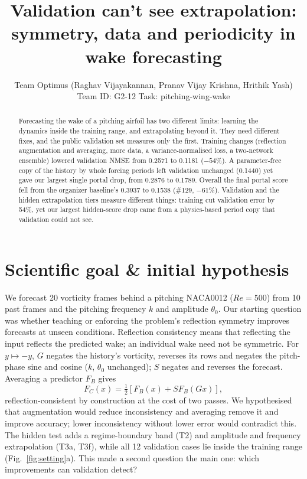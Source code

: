\documentclass{article}
\title{Validation can't see extrapolation: symmetry, data and periodicity in wake forecasting}
\author{
  Team Optimus (Raghav Vijayakannan, Pranav Vijay Krishna, Hrithik Yash)\\
  Team ID: G2-12 \quad Task: pitching-wing-wake
}
\begin{document}
\maketitle

\begin{abstract}
Forecasting the wake of a pitching airfoil has two different limits: learning the
dynamics inside the training range, and extrapolating beyond it. They need
different fixes, and the public validation set measures only the first. Training
changes (reflection augmentation and averaging, more data, a variance-normalised
loss, a two-network ensemble) lowered validation NMSE from 0.2571 to 0.1181
($-54\%$). A parameter-free copy of the history by whole forcing periods left
validation unchanged (0.1440) yet gave our largest single portal drop, from 0.2876
to 0.1789. Overall the
final portal score fell from the organizer baseline's 0.3937 to 0.1538 (\#129,
$-61\%$). Validation and the hidden
extrapolation tiers measure different things: training cut validation error by
54\%, yet our largest hidden-score drop came from a physics-based period copy that
validation could not see.
\end{abstract}

\section{Scientific goal \& initial hypothesis}

We forecast 20 vorticity frames behind a pitching NACA0012 ($Re=500$) from 10 past
frames and the pitching frequency $k$ and amplitude $\theta_0$. Our starting
question was whether teaching or enforcing the problem's reflection symmetry
improves forecasts at unseen conditions. Reflection consistency means that
reflecting the input reflects the predicted wake; an individual wake need not be
symmetric. For $y\mapsto-y$, $G$ negates the history's vorticity, reverses its rows
and negates the pitch-phase sine and cosine ($k$, $\theta_0$ unchanged); $S$
negates and reverses the forecast. Averaging a predictor $F_B$ gives
\begin{equation}
F_C(x)=\tfrac12\left[F_B(x)+S F_B(Gx)\right],
\end{equation}
reflection-consistent by construction at the cost of two passes. We hypothesised
that augmentation would reduce inconsistency and averaging remove it and improve
accuracy; lower inconsistency without lower error would contradict this. The hidden
test adds a regime-boundary band (T2) and amplitude and frequency extrapolation (T3a,
T3f), while all 12 validation cases lie inside the training range
(Fig.~\ref{fig:setting}a). This made a second question the main one: which
improvements can validation detect?
\end{document}
